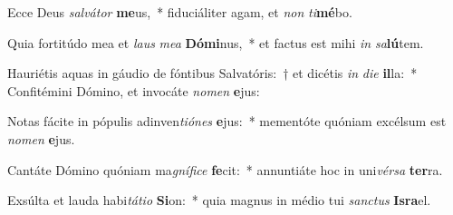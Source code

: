 \item Ecce Deus \textit{sal}\textit{vá}\textit{tor} \textbf{me}us,~* fiduciáliter agam, et \textit{non} \textit{ti}\textbf{mé}bo.
\item Quia fortitúdo mea et \textit{laus} \textit{me}\textit{a} \textbf{Dó}\textbf{mi}nus,~* et factus est mihi \textit{in} \textit{sa}\textbf{lú}tem.
\item Hauriétis aquas in gáudio de fóntibus Salvatóris:~† et dicétis \textit{in} \textit{di}\textit{e} \textbf{il}la:~* Confitémini Dómino, et invocáte \textit{no}\textit{men} \textbf{e}jus:
\item Notas fácite in pópulis adinven\textit{ti}\textit{ó}\textit{nes} \textbf{e}jus:~* mementóte quóniam excélsum est \textit{no}\textit{men} \textbf{e}jus.
\item Cantáte Dómino quóniam ma\textit{gní}\textit{fi}\textit{ce} \textbf{fe}cit:~* annuntiáte hoc in uni\textit{vér}\textit{sa} \textbf{ter}ra.
\item Exsúlta et lauda habi\textit{tá}\textit{ti}\textit{o} \textbf{Si}on:~* quia magnus in médio tui \textit{sanc}\textit{tus} \textbf{Is}\textbf{ra}el.
